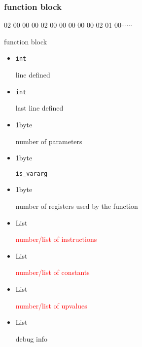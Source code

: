 \subsubsection{function block}
\begin{frame}[fragile]{\insertsubsubsectionhead}
	02 00 00 00 02 00 00 00 00 00 02 01 00$\cdots\cdots$

	function block
	\scriptsize
	\begin{multicols}{2}
		\begin{itemize}
			\item \lstinline{int}

				line defined
			\item \lstinline{int}

				last line defined
			\item 1byte

				number of parameters
			\item 1byte

				\lstinline{is_vararg}
			\item 1byte

				number of registers used by the function
			\item List

				\textcolor<2->{red}{number/list of instructions}
			\item List

				\textcolor<2->{red}{number/list of constants}
			\item List

				\textcolor<2->{red}{number/list of upvalues}
			\item List

				debug info
		\end{itemize}
	\end{multicols}
\end{frame}
